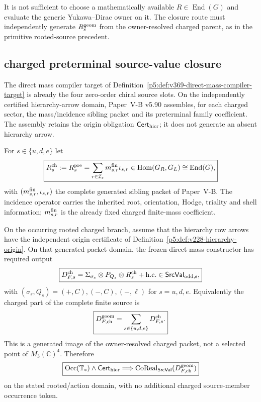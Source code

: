 \documentclass[12pt,a4paper]{article}
\begin{document}
\begin{remark}
\label{p5:rem:v396-no-owner-selection}
It is not sufficient to choose a mathematically available
$R\in\operatorname{End}(G)$ and evaluate the generic Yukawa--Dirac owner on
it.  The closure route must independently generate $R_s^{\rm geom}$ from the
owner-resolved charged parent, as in the primitive rooted-source precedent.
\end{remark}

\subsection*{charged preterminal source-value closure}
\label{p5:sec:v397-charged-preterminal-srcval-closure}
The direct mass compiler target of
Definition~\ref{p5:def:v369-direct-mass-compiler-target} is already the four
zero-order chiral source slots. On the independently certified
hierarchy-arrow domain, Paper~V-B v5.90 assembles, for each charged
sector, the mass/incidence sibling packet and its preterminal family
coefficient. The assembly retains the origin obligation
$\mathsf{Cert}_{\rm hier}$; it does not generate an absent hierarchy arrow.

\begin{definition}
\label{p5:def:v397-charged-preterminal-family-coefficient}
For $s\in\{u,d,e\}$ let
\[
 \boxed{
 R_s^{\rm ch}:=R_s^{\rm pre}
 =\sum_{r\in\mathcal I_s}m^{\rm fin}_{s,r}\iota_{s,r}
 \in\operatorname{Hom}(G_R,G_L)\cong\operatorname{End}(G),}
\]
with $(m^{\rm fin}_{s,r},\iota_{s,r})$ the complete generated sibling packet
of Paper~V-B.  The incidence operator carries the inherited root, orientation,
Hodge, triality and shell information; $m^{\rm fin}_{s,r}$ is the already
fixed charged finite-mass coefficient.
\end{definition}

\begin{theorem}
\label{p5:thm:v397-charged-preterminal-srcval-realization}
On the occurring rooted charged branch, assume that the hierarchy row
arrows have the independent origin certificate of
Definition~\ref{p5:def:v228-hierarchy-origin}. On that generated-packet
domain, the frozen direct-mass constructor has required output
\[
 \boxed{
 D_{F,s}^{\rm ch}
 =\Sigma_{\sigma_s}\otimes P_{Q_s}\otimes R_s^{\rm ch}
 +\mathrm{h.c.}
 \in\mathsf{SrcVal}_{\rm odd,s},}
\]
with $(\sigma_s,Q_s)=(+,C),(-,C),(-,\ell)$ for $s=u,d,e$.
Equivalently the charged part of the complete finite source is
\[
 \boxed{D_{F,\rm ch}^{\rm geom}=\sum_{s\in\{u,d,e\}}D_{F,s}^{\rm ch}.}
\]
This is a generated image of the owner-resolved charged packet, not a selected
point of $M_3(\mathbb C)^4$.  Therefore
\[
 \boxed{
 \operatorname{Occ}(\mathbb T_*)\land\mathsf{Cert}_{\rm hier}
 \Longrightarrow
 \operatorname{CoReal}_{\mathsf{SrcVal}}
 (D_{F,\rm ch}^{\rm geom})}
\]
on the stated rooted/action domain, with no additional charged source-member
occurrence token.
\end{theorem}
\end{document}
